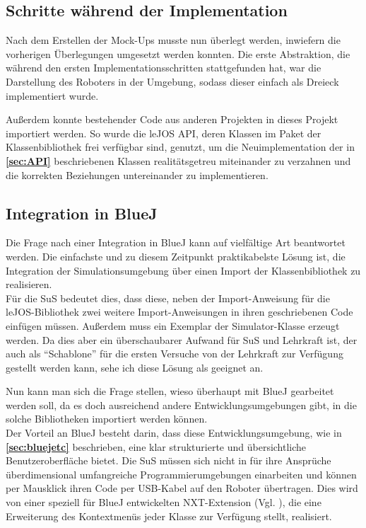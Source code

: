 \documentclass[paper=a4, pagesize, DIV=calc, BCOR=15mm, twoside=on, onecolumn=on, open = right, titlepage =on, parskip =half-, headsepline = on, footsepline = on, chapterprefix = on, appendixprefix = off, fontsize = 12pt, numbers = noenddot, abstract = on]{scrbook}
\numberwithin{equation}{chapter}
\theoremstyle{definition}
\theoremstyle{plain}
\theoremstyle{plain}
\theoremstyle{remark}
\theoremstyle{plain}
\theoremstyle{plain}
\begin{document}
\subsection{Schritte während der Implementation}
\onehalfspacing
Nach dem Erstellen der Mock-Ups musste nun überlegt werden, inwiefern die vorherigen Überlegungen umgesetzt werden konnten. Die erste Abstraktion, die während den ersten Implementationsschritten stattgefunden hat, war die Darstellung des Roboters in der Umgebung, sodass dieser einfach als Dreieck implementiert wurde. 

Außerdem konnte bestehender Code aus anderen Projekten in dieses Projekt importiert werden. So wurde die leJOS API, deren Klassen im Paket der Klassenbibliothek frei verfügbar sind, genutzt, um die Neuimplementation der in \textbf{\ref{sec:API}} beschriebenen Klassen realitätsgetreu miteinander zu verzahnen und die korrekten Beziehungen untereinander zu implementieren.

\par \singlespacing
\subsection{Integration in BlueJ}
\label{sec:integration}
\onehalfspacing
Die Frage nach einer Integration in BlueJ kann auf vielfältige Art beantwortet werden. Die einfachste und zu diesem Zeitpunkt praktikabelste Lösung ist, die Integration der Simulationsumgebung über einen Import der Klassenbibliothek zu realisieren.\\
Für die SuS bedeutet dies, dass diese, neben der Import-Anweisung für die leJOS-Bibliothek zwei weitere Import-Anweisungen in ihren geschriebenen Code einfügen müssen. Außerdem muss ein Exemplar der Simulator-Klasse erzeugt werden. Da dies aber ein überschaubarer Aufwand für SuS und Lehrkraft ist, der auch als "`Schablone"' für die ersten Versuche von der Lehrkraft zur Verfügung gestellt werden kann, sehe ich diese Lösung als geeignet an.

Nun kann man sich die Frage stellen, wieso überhaupt mit BlueJ gearbeitet werden soll, da es doch ausreichend andere Entwicklungsumgebungen gibt, in die solche Bibliotheken importiert werden können.\\
Der Vorteil an BlueJ besteht darin, dass diese Entwicklungsumgebung, wie in \textbf{\ref{sec:bluejetc}} beschrieben, eine klar strukturierte und übersichtliche Benutzeroberfläche bietet. Die SuS müssen sich nicht in für ihre Ansprüche überdimensional umfangreiche Programmierumgebungen einarbeiten und können per Mausklick ihren Code per USB-Kabel auf den Roboter übertragen. Dies wird von einer speziell für BlueJ entwickelten NXT-Extension  (Vgl. \cite{bowes:12}), die eine Erweiterung des Kontextmenüs jeder Klasse zur Verfügung stellt, realisiert.
\end{document}
